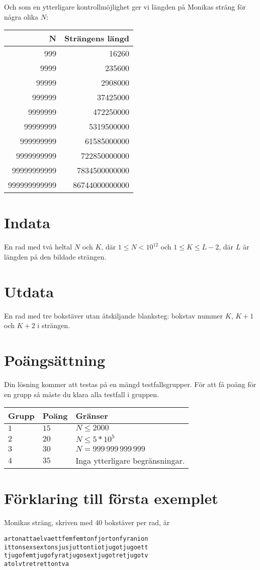 Och som en ytterligare kontrollmöjlighet ger vi längden på Monikas sträng för några olika $N$:

\begin{tabular}{|r|r|}\hline
{\bf N} & {\bf Strängens längd} \\ \hline
999 & 16260 \\
9999 & 235600 \\
99999 & 2908000 \\
999999 & 37425000 \\
9999999   & 472250000 \\
99999999 & 5319500000\\
999999999 & 61585000000\\
9999999999 & 722850000000 \\
99999999999 &	7834500000000 \\
999999999999 &86744000000000 \\ \hline
\end{tabular}


\section*{Indata}
En rad med två heltal $N$ och $K$, där $1 \leq N < 10^12$ och $1 \leq K \leq L-2$, där $L$ är längden på den bildade strängen.

\section*{Utdata}
En rad med tre bokstäver utan åtskiljande blanksteg: bokstav nummer $K$, $K+1$ och $K+2$ i strängen. 

\section*{Poängsättning}
Din lösning kommer att testas på en mängd testfallsgrupper.
För att få poäng för en grupp så måste du klara alla testfall i gruppen.

\noindent
\begin{tabular}{| l | l | p{12cm} |}
  \hline
  \textbf{Grupp} & \textbf{Poäng} & \textbf{Gränser} \\ \hline
  $1$   & $15$       & $N \leq 2000 $\\ \hline
  $2$   & $20$       & $N \leq 5*10^5 $\\ \hline
  $3$   & $30$       & $N = 999\,999\,999\,999 $\\ \hline
  $4$   & $35$       & Inga ytterligare begränsningar. \\ \hline
\end{tabular}

\section*{Förklaring till första exemplet}

Monikas sträng, skriven med 40 bokstäver per rad, är

\begin{verbatim}
artonattaelvaettfemfemtonfjortonfyranion
ittonsexsextonsjusjuttontiotjugotjugoett
tjugofemtjugofyratjugosextjugotretjugotv
atolvtretrettontva
\end{verbatim}
